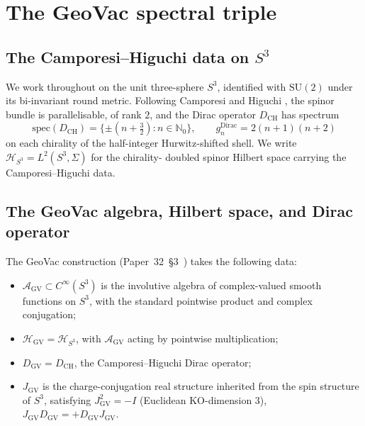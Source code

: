 \documentclass[11pt,a4paper]{article}
\theoremstyle{plain}
\theoremstyle{definition}
\newcommand{\sthree}{S^{3}}
\newcommand{\Hilb}{\mathcal{H}}
\newcommand{\HGV}{\mathcal{H}_{\mathrm{GV}}}
\newcommand{\AGV}{\mathcal{A}_{\mathrm{GV}}}
\newcommand{\DGV}{D_{\mathrm{GV}}}
\newcommand{\DCH}{D_{\mathrm{CH}}}
\newcommand{\N}{\mathbb{N}}
\newcommand{\SU}{\mathrm{SU}}
\begin{document}
\section{The GeoVac spectral triple}
\label{sec:triple}

\subsection{The Camporesi--Higuchi data on $\sthree$}

We work throughout on the unit three-sphere $\sthree$, identified
with $\SU(2)$ under its bi-invariant round metric.  Following
Camporesi and Higuchi \cite{camporesi_higuchi1996}, the spinor
bundle is parallelisable, of rank $2$, and the Dirac operator
$\DCH$ has spectrum
\begin{equation}
\mathrm{spec}(\DCH) = \{\pm(n + \tfrac{3}{2}) : n \in \N_{0}\},
\qquad
g^{\mathrm{Dirac}}_{n} = 2(n+1)(n+2)
\label{eq:ch_spectrum}
\end{equation}
on each chirality of the half-integer Hurwitz-shifted shell.  We
write $\Hilb_{\sthree} = L^{2}(\sthree, \Sigma)$ for the chirality-
doubled spinor Hilbert space carrying the Camporesi--Higuchi data.

\subsection{The GeoVac algebra, Hilbert space, and Dirac operator}

The GeoVac construction (Paper~32~\S 3~\cite{paper32}) takes the
following data:

\begin{itemize}\setlength\itemsep{0pt}
\item $\AGV \subset C^{\infty}(\sthree)$ is the involutive algebra
of complex-valued smooth functions on $\sthree$, with the standard
pointwise product and complex conjugation;
\item $\HGV = \Hilb_{\sthree}$, with $\AGV$ acting by pointwise
multiplication;
\item $\DGV = \DCH$, the Camporesi--Higuchi Dirac operator;
\item $J_{\mathrm{GV}}$ is the charge-conjugation real structure
inherited from the spin structure of $\sthree$, satisfying
$J_{\mathrm{GV}}^{2} = -I$ (Euclidean KO-dimension $3$),
$J_{\mathrm{GV}} \DGV = + \DGV J_{\mathrm{GV}}$.
\end{itemize}
\end{document}
